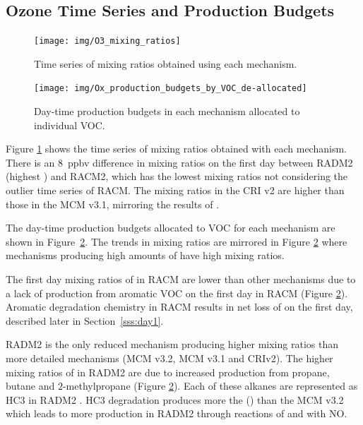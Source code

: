 %
\subsection[O3 Time Series and Ox Production Budgets]{Ozone Time Series and  Production Budgets} \label{ss:O3_time_series}
%
\begin{figure}
    \centering
    \texttt{[image: img/O3\_mixing\_ratios]}
    \vspace{0mm}
    \caption{Time series of  mixing ratios obtained using each mechanism.}
    \vspace{-4mm}
    \label{f:time_series}
\end{figure}
%
\begin{figure}
    \centering
    \texttt{[image: img/Ox\_production\_budgets\_by\_VOC\_de-allocated]}
    \vspace{1mm}
    \caption{Day-time  production budgets in each mechanism allocated to individual VOC.}
    \vspace{-4mm}
    \label{f:Ox_tagged_budgets}
\end{figure}
%
Figure \ref{f:time_series} shows the time series of  mixing ratios obtained with each mechanism.
There is an \mbox{$8$ ppbv} difference in  mixing ratios on the first day between RADM2 (highest ) and RACM2, which has the lowest  mixing ratios not considering the outlier time series of RACM.
The  mixing ratios in the CRI v2 are higher than those in the MCM v3.1, mirroring the results of \citet{Jenkin:2008}.

The day-time  production budgets allocated to VOC for each mechanism are shown in \mbox{Figure \ref{f:Ox_tagged_budgets}}.
The trends in  mixing ratios are mirrored in Figure \ref{f:Ox_tagged_budgets} where mechanisms producing high amounts of  have high  mixing ratios.

The first day mixing ratios of  in RACM are lower than other mechanisms due to a lack of  production from aromatic VOC on the first day in RACM (Figure \ref{f:Ox_tagged_budgets}).
Aromatic degradation chemistry in RACM results in net loss of  on the first day, described later in \mbox{Section \ref{sss:day1}}.

RADM2 is the only reduced mechanism producing higher  mixing ratios than more detailed mechanisms (MCM v3.2, MCM v3.1 and CRIv2).
The higher mixing ratios of  in RADM2 are due to increased  production from propane, butane and $2$-methylpropane (Figure \ref{f:Ox_tagged_budgets}).
Each of these alkanes are represented as HC3 in RADM2 \citep{Stockwell:1990}.
HC3 degradation produces more the () than the MCM v3.2 which leads to more  production in RADM2 through reactions of  and  with NO. 
%
